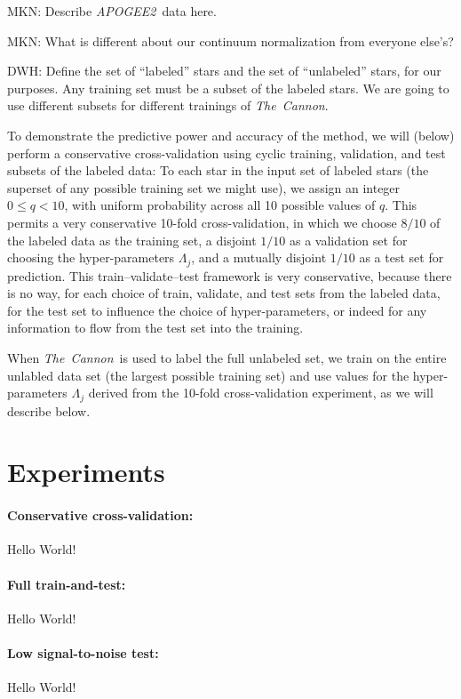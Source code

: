 \documentclass[12pt,preprint]{aastex}
\newcommand{\project}[1]{\textsl{#1}}
\newcommand{\thecannon}{\project{The~Cannon}}
\newcommand{\acronym}[1]{{\small{#1}}}
\newcommand{\apogee}{\project{\acronym{APOGEE2}}}
\begin{document}
MKN: Describe \apogee\ data here.

MKN: What is different about our continuum normalization from everyone else's?

DWH: Define the set of ``labeled'' stars and the set of ``unlabeled''
stars, for our purposes.  Any training set must be a subset of the
labeled stars.
We are going to use different subsets for different trainings of \thecannon.

To demonstrate the predictive power and accuracy of the method, we
will (below) perform a conservative cross-validation using cyclic
training, validation, and test subsets of the labeled data:
To each star in the input set of labeled stars (the superset of any
possible training set we might use), we assign an integer $0\leq
q<10$, with uniform probability across all 10 possible values of $q$.
This permits a very conservative 10-fold cross-validation, in which we
choose $8/10$ of the labeled data as the training set, a disjoint
$1/10$ as a validation set for choosing the hyper-parameters
$\Lambda_j$, and a mutually disjoint $1/10$ as a test set for
prediction.
This train--validate--test framework is very conservative, because there
is no way, for each choice of train, validate, and test sets from the
labeled data, for the test set to influence the choice of
hyper-parameters, or indeed for any information to flow from the test
set into the training.

When \thecannon\ is used to label the full unlabeled set, we train on
the entire unlabled data set (the largest possible training set) and
use values for the hyper-parameters $\Lambda_j$ derived from the
10-fold cross-validation experiment, as we will describe below.

\section{Experiments}

\paragraph{Conservative cross-validation:}
Hello World!

\paragraph{Full train-and-test:}
Hello World!

\paragraph{Low signal-to-noise test:}
Hello World!
\end{document}
